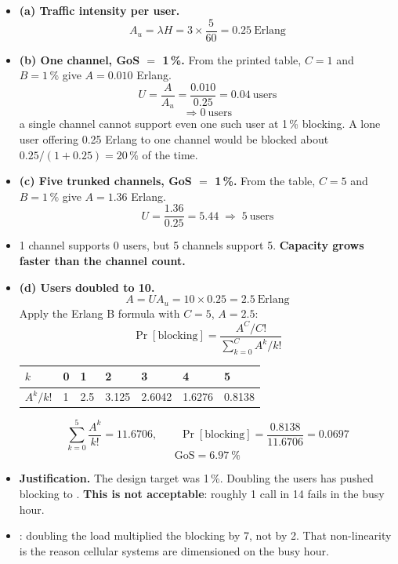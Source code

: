 \begin{itemize}
  \item \textbf{(a) Traffic intensity per user.}
        \[ A_u = \lambda H = 3 \times \frac{5}{60} = \boxed{0.25\ \text{Erlang}} \]
  \item \textbf{(b) One channel, GoS $=$ 1\,\%.}
        From the printed table, $C = 1$ and $B = 1\,\%$ give $A = 0.010$ Erlang.
        \[ U = \frac{A}{A_u} = \frac{0.010}{0.25} = 0.04\ \text{users} \]
        \[ \Rightarrow \boxed{0\ \text{users}} \]
         a single channel cannot support even one such user at 1\,\% blocking.
        A lone user offering 0.25 Erlang to one channel would be blocked about
        $0.25/(1+0.25) = 20\,\%$ of the time.
  \item \textbf{(c) Five trunked channels, GoS $=$ 1\,\%.}
        From the table, $C = 5$ and $B = 1\,\%$ give $A = 1.36$ Erlang.
        \[ U = \frac{1.36}{0.25} = 5.44 \;\Rightarrow\; \boxed{5\ \text{users}} \]
  \item {} 1 channel supports 0 users, but 5 channels
        support 5. \textbf{Capacity grows faster than the channel count.}
  \item \textbf{(d) Users doubled to 10.}
        \[ A = U A_u = 10 \times 0.25 = 2.5\ \text{Erlang} \]
        Apply the Erlang B formula with $C = 5$, $A = 2.5$:
        \[ \Pr[\text{blocking}] = \frac{A^C/C!}{\sum_{k=0}^{C} A^k/k!} \]
        \begin{center}\small
        \begin{tabular}{@{}lllllll@{}}
        \toprule
        $k$ & 0 & 1 & 2 & 3 & 4 & 5 \\
        \midrule
        $A^k/k!$ & 1 & 2.5 & 3.125 & 2.6042 & 1.6276 & 0.8138 \\
        \bottomrule
        \end{tabular}
        \end{center}
        \[ \sum_{k=0}^{5} \frac{A^k}{k!} = 11.6706, \qquad
           \Pr[\text{blocking}] = \frac{0.8138}{11.6706} = 0.0697 \]
        \[ \boxed{\text{GoS} = 6.97\ \% } \]
  \item \textbf{Justification.} The design target was 1\,\%. Doubling the users has pushed
        blocking to .
        \textbf{This is not acceptable}: roughly 1 call in 14 fails in the busy hour.
  \item {}: doubling the load multiplied the blocking by 7, not by 2.
        That non-linearity is the reason cellular systems are dimensioned on the busy hour.
\end{itemize}

